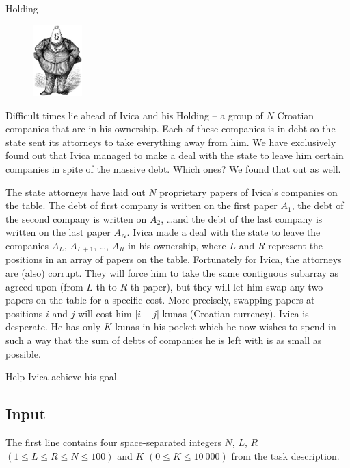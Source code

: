 \begin{statement}[
  problempoints=110,
  timelimit=2 seconds,
  memorylimit=256 MiB,
]{Holding}

\setlength\intextsep{-0.1cm}
\begin{figure}
\centering
\includegraphics[width=0.17\textwidth]{img/holding.png}
\end{figure}

Difficult times lie ahead of Ivica and his Holding -- a group of $N$ Croatian
companies that are in his ownership. Each of these companies is in debt so the
state sent its attorneys to take everything away from him. We have exclusively
found out that Ivica managed to make a deal with the state to leave him certain
companies in spite of the massive debt. Which ones? We found that out as well.

The state attorneys have laid out $N$ proprietary papers of Ivica's companies
on the table.  The debt of first company is written on the first paper $A_1$,
the debt of the second company is written on $A_2$, \dots and the debt of the
last company is written on the last paper $A_N$. Ivica made a deal with the
state to leave the companies $A_L$, $A_{L+1}$, \dots , $A_R$ in his
ownership, where $L$ and $R$ represent the positions in an array of papers on
the table.  Fortunately for Ivica, the attorneys are (also) corrupt. They
will force him to take the same contiguous subarray as agreed upon (from
$L$-th to $R$-th paper), but they will let him swap any two papers on the
table for a specific cost. More precisely, swapping papers at positions $i$
and $j$ will cost him $|i-j|$ kunas (Croatian currency).  Ivica is desperate.
He has only $K$ kunas in his pocket which he now wishes to spend in such a
way that the sum of debts of companies he is left with is as small as
possible.

Help Ivica achieve his goal.

\subsection*{Input}
The first line contains four space-separated integers $N$, $L$, $R$
$(1 \le L \le R \le N \le 100)$ and $K$ $(0 \le K \le 10\ 000)$ from the
task description.


\end{statement}
